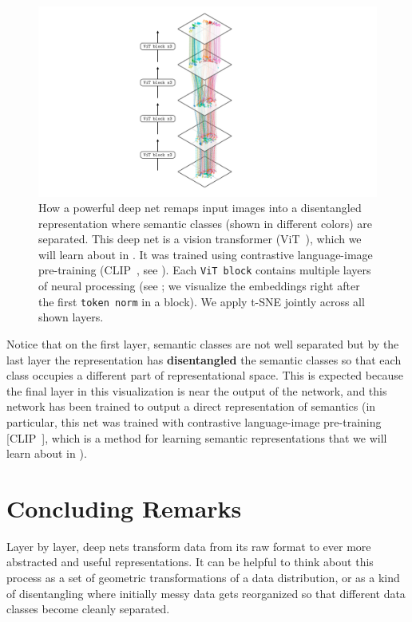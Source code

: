 \begin{figure}[t]
    \centerline{
        \includegraphics[width=0.375\linewidth]{./figures/neural_nets/vit_mapping_plot.pdf}
    }
    \caption{How a powerful deep net remaps input images into a disentangled representation where semantic classes (shown in different colors) are separated. This deep net is a vision transformer (ViT~\cite{dosovitskiy2020vit}), which we will learn about in \sect{\ref{sec:transformers:ViT_arch}}. It was trained using contrastive language-image pre-training (CLIP~\cite{radford2021learning}, see \sect{\ref{sec:VLMs:CLIP}}). Each \texttt{ViT block} contains multiple layers of neural processing (see \fig{\ref{fig:transformers:ViT_arch}}; we visualize the embeddings right after the first \texttt{token norm} in a block). We apply t-SNE jointly across all shown layers.} %
    \label{fig:neural_nets:vit_mapping_plot}
\end{figure}

Notice that on the first layer, semantic classes are not well separated but by the last layer the representation has {\bf disentangled} the semantic classes so that each class occupies a different part of representational space. This is expected because the final layer in this visualization is near the output of the network, and this network has been trained to output a direct representation of semantics (in particular, this net was trained with contrastive language-image pre-training [CLIP~\cite{radford2021learning}], which is a method for learning semantic representations that we will learn about in \sect{\ref{sec:VLMs:CLIP}}).%

\section{Concluding Remarks}
Layer by layer, deep nets transform data from its raw format to ever more abstracted and useful representations. It can be helpful to think about this process as a set of geometric transformations of a data distribution, or as a kind of disentangling where initially messy data gets reorganized so that different data classes become cleanly separated.